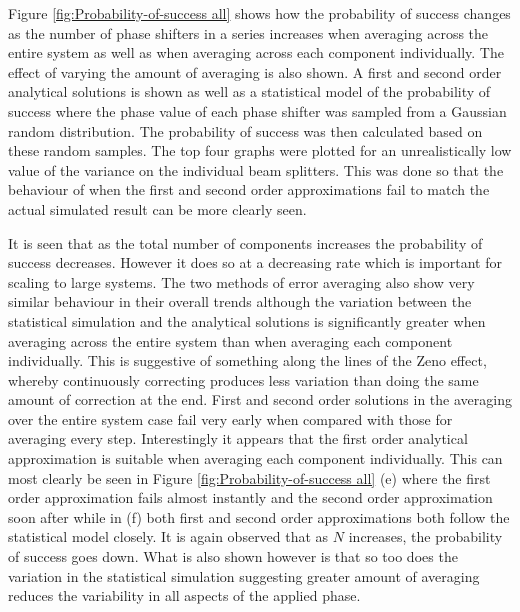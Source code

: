 \documentclass[aps,pra,twocolumn,superscriptaddress,numerical]{revtex4-1}
\begin{document}
		
		Figure \ref{fig:Probability-of-success all} shows how the probability of success changes as the number of phase shifters in a series increases when averaging across the entire system as well as when averaging across each component individually. The effect of varying the amount of averaging is also shown. A first and second order analytical solutions	is  shown as well as a statistical model of the probability of success where the phase value of each phase shifter was sampled from a Gaussian random distribution. The probability of success was then calculated based on these random samples. The top four graphs were plotted for an unrealistically low value of the variance on the individual beam splitters. This was done so that the behaviour of when the first and second order approximations fail to match the actual simulated result can be more clearly seen. 
		
		It is seen that as the total number of components increases the probability of success decreases. However it does so at a decreasing rate which is important for scaling to large systems. The two methods of error averaging also show very similar behaviour in their overall trends although the variation between the statistical simulation and the analytical solutions is significantly greater when averaging across the entire system than when averaging each component individually. This is suggestive of something along the lines of the Zeno effect, whereby continuously correcting produces less variation than doing the same amount of correction at the end. First and second order solutions in the averaging over the entire system case fail very early when compared with those for averaging every step. Interestingly it appears that the first order analytical approximation is suitable when averaging each component individually. This can most clearly be seen in Figure \ref{fig:Probability-of-success all} (e) where the first order approximation fails almost instantly and the second order approximation soon after while in (f) both first and second order approximations both follow the statistical model closely. It is again observed that as $N$ increases, the probability of success goes down. What is also shown however is that so too does the variation in the statistical simulation suggesting greater amount of averaging reduces the variability in all aspects of the applied phase.
		
\end{document}
